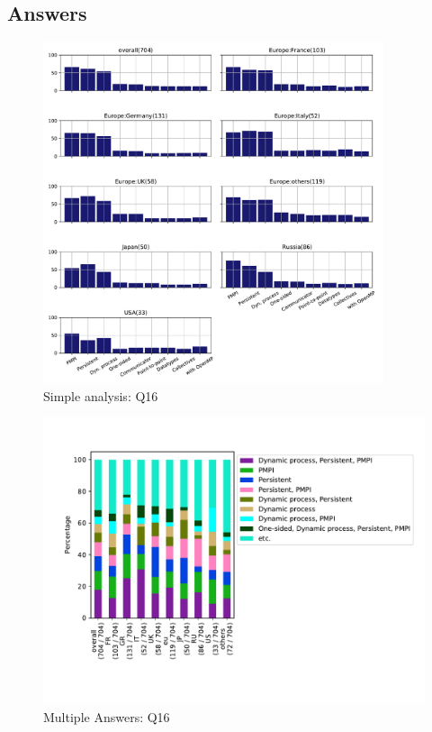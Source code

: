 
\subsection{Answers}



\begin{figure}[htb]
\begin{center}
\includegraphics[width=10cm]{../pdfs/Q16.pdf}
\caption{Simple analysis: Q16}
\label{fig:Q16}
\end{center}
\end{figure}

\begin{figure}[htb]
\begin{center}
\includegraphics[width=14cm]{../pdfs/Q16-mans.pdf}
\caption{Multiple Answers: Q16}
\label{fig:Q16-mans}
\end{center}
\end{figure}

